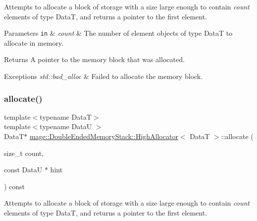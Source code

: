 Attempts to allocate a block of storage with a size large enough to contain {\itshape count} elements of type {\ttfamily DataT}, and returns a pointer to the first element.


\begin{DoxyParams}[1]{Parameters}
\mbox{\tt in}  & {\em count} & The number of element objects of type {\ttfamily DataT} to allocate in memory. \\
\hline
\end{DoxyParams}
\begin{DoxyReturn}{Returns}
A pointer to the memory block that was allocated. 
\end{DoxyReturn}

\begin{DoxyExceptions}{Exceptions}
{\em std\+::bad\+\_\+alloc} & Failed to allocate the memory block. \\
\hline
\end{DoxyExceptions}
\hypertarget{structmage_1_1_double_ended_memory_stack_1_1_high_allocator_aedb3ef31fc451aee62e814d8c617678f}{}\label{structmage_1_1_double_ended_memory_stack_1_1_high_allocator_aedb3ef31fc451aee62e814d8c617678f} 
\subsubsection{\texorpdfstring{allocate()}{allocate()}\hspace{0.1cm}{\footnotesize\ttfamily [2/2]}}
{\footnotesize\ttfamily template$<$typename DataT$>$ \\
template$<$typename DataU $>$ \\
DataT$\ast$ \hyperlink{structmage_1_1_double_ended_memory_stack_1_1_high_allocator}{mage\+::\+Double\+Ended\+Memory\+Stack\+::\+High\+Allocator}$<$ DataT $>$\+::allocate (\begin{DoxyParamCaption}\item[{size\+\_\+t}]{count,  }\item[{const DataU $\ast$}]{hint }\end{DoxyParamCaption}) const}

Attempts to allocate a block of storage with a size large enough to contain {\itshape count} elements of type {\ttfamily DataT}, and returns a pointer to the first element.



